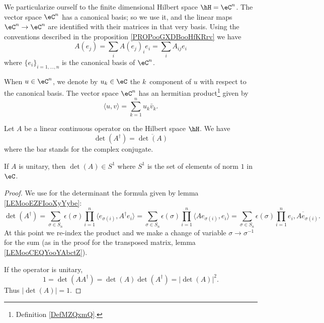 We particularize ourself to the finite dimensional Hilbert space \( \hH=\eC^n\). The vector space \( \eC^n\) has a canonical basis; so we use it, and the linear maps \( \eC^n\to \eC^n\) are identified with their matrices in that very basis. Using the conventions described in the proposition \ref{PROPooGXDBooHfKRrv} we have
\begin{equation}
	A(e_j)=\sum_iA(e_j)_ie_i=\sum_iA_{ij}e_i
\end{equation}
where \( \{ e_i \}_{i=1,\ldots, n}\) is the canonical basis of \( \eC^n\).

When \( u\in \eC^n\), we denote by \( u_k\in \eC\) the \( k\)\ieme\ component of \( u\) with respect to the canonical basis. The vector space \( \eC^n\) has an hermitian product\footnote{Definition \ref{DefMZQxmQ}.} given by
\begin{equation}
	\langle u, v\rangle =\sum_{k=1}^nu_k\bar v_k.
\end{equation}

\begin{lemma}       \label{LEMooKEUZooUjQVmp}
	Let \( A\) be a linear continuous operator on the Hilbert space \( \hH\). We have
	\begin{equation}
		\det(A^{\dag})=\overline{ \det(A) }
	\end{equation}
	where the bar stands for the complex conjugate.

	If \( A\) is unitary, then \( \det(A)\in S^1\) where \( S^1\) is the set of elements of norm \( 1\) in \( \eC\).
\end{lemma}

\begin{proof}
	We use for the determinant the formula given by lemma \ref{LEMooEZFIooXyYybe}:
	\begin{equation}
		\det(A^{\dag})=\sum_{\sigma\in S_n}\epsilon(\sigma)\prod_{i=1}^n\langle e_{\sigma(i)}, A^{\dag}e_i\rangle =  \sum_{\sigma\in S_n}\epsilon(\sigma)\prod_{i=1}^n \langle Ae_{\sigma(i)}, e_i\rangle = \sum_{\sigma\in S_n}\epsilon(\sigma)\prod_{i=1}^n\overline{ e_i,Ae_{\sigma(i)} }.
	\end{equation}
	At this point we re-index the product and we make a change of variable $\sigma\to \sigma^{-1}$ for the sum (as in the proof for the transposed matrix, lemma \ref{LEMooCEQYooYAbctZ}).

	If the operator is unitary,
	\begin{equation}
		1=\det(AA^{\dag})=\det(A)\det(A^{\dag})=| \det(A) |^2.
	\end{equation}
	Thus \( | \det(A) |=1\).
\end{proof}

